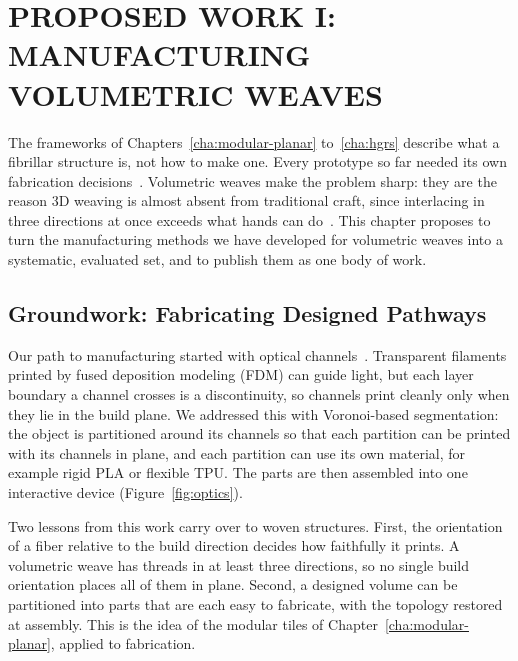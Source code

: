%
%

\chapter{\uppercase{Proposed Work I: Manufacturing Volumetric Weaves}}
\label{cha:manufacturing}

The frameworks of Chapters~\ref{cha:modular-planar} to~\ref{cha:hgrs} describe what a fibrillar structure is, not how to make one. Every prototype so far needed its own fabrication decisions~\cite{yildiz2026hypergraph}. Volumetric weaves make the problem sharp: they are the reason 3D weaving is almost absent from traditional craft, since interlacing in three directions at once exceeds what hands can do~\cite{yildiz2025volumetric}. This chapter proposes to turn the manufacturing methods we have developed for volumetric weaves into a systematic, evaluated set, and to publish them as one body of work.

\section{Groundwork: Fabricating Designed Pathways}
\label{sec:optics}

Our path to manufacturing started with optical channels~\cite{deshpande2025optical}. Transparent filaments printed by fused deposition modeling (FDM) can guide light, but each layer boundary a channel crosses is a discontinuity, so channels print cleanly only when they lie in the build plane. We addressed this with Voronoi-based segmentation: the object is partitioned around its channels so that each partition can be printed with its channels in plane, and each partition can use its own material, for example rigid PLA or flexible TPU. The parts are then assembled into one interactive device (Figure~\ref{fig:optics}).

Two lessons from this work carry over to woven structures. First, the orientation of a fiber relative to the build direction decides how faithfully it prints. A volumetric weave has threads in at least three directions, so no single build orientation places all of them in plane. Second, a designed volume can be partitioned into parts that are each easy to fabricate, with the topology restored at assembly. This is the idea of the modular tiles of Chapter~\ref{cha:modular-planar}, applied to fabrication.

